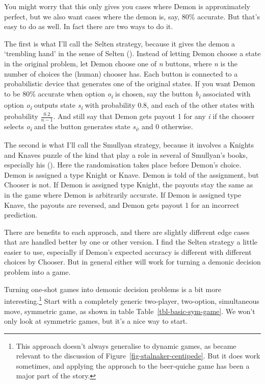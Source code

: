 \documentclass[
  12pt,
  letterpaper,
  DIV=11,
  numbers=noendperiod]{scrreprt}
\begin{document}
You might worry that this only gives you cases where Demon is
approximately perfect, but we also want cases where the demon is, say,
80\% accurate. But that's easy to do as well. In fact there are two ways
to do it.

The first is what I'll call the Selten strategy, because it gives the
demon a `trembling hand' in the sense of Selten
(). Instead of letting Demon choose a
state in the original problem, let Demon choose one of \emph{n} buttons,
where \emph{n} is the number of choices the (human) chooser has. Each
button is connected to a probabilistic device that generates one of the
original states. If you want Demon to be 80\% accurate when option
\emph{o\textsubscript{i}} is chosen, say the button
\emph{b\textsubscript{i}} associated with option
\emph{o\textsubscript{i}} outputs state \emph{s\textsubscript{i}} with
probability 0.8, and each of the other states with probability
\(\frac{0.2}{n - 1}\). And still say that Demon gets payout 1 for any
\emph{i} if the chooser selects \emph{o\textsubscript{i}} and the button
generates state \emph{s\textsubscript{i}}, and 0 otherwise.

The second is what I'll call the Smullyan strategy, because it involves
a Knights and Knaves puzzle of the kind that play a role in several of
Smullyan's books, especially his ().
Here the randomisation takes place before Demon's choice. Demon is
assigned a type Knight or Knave. Demon is told of the assignment, but
Chooser is not. If Demon is assigned type Knight, the payouts stay the
same as in the game where Demon is arbitrarily accurate. If Demon is
assigned type Knave, the payouts are reversed, and Demon gets payout 1
for an incorrect prediction.

There are benefits to each approach, and there are slightly different
edge cases that are handled better by one or other version. I find the
Selten strategy a little easier to use, especially if Demon's expected
accuracy is different with different choices by Chooser. But in general
either will work for turning a demonic decision problem into a game.

Turning one-shot games into demonic decision problems is a bit more
interesting.\footnote{This approach doesn't always generalise to dynamic
  games, as became relevant to the discussion of
  Figure~\ref{fig-stalnaker-centipede}. But it does work sometimes, and
  applying the approach to the beer-quiche game has been a major part of
  the story.} Start with a completely generic two-player, two-option,
simultaneous move, symmetric game, as shown in table
Table~\ref{tbl-basic-sym-game}. We won't only look at symmetric games,
but it's a nice way to start.
\end{document}
